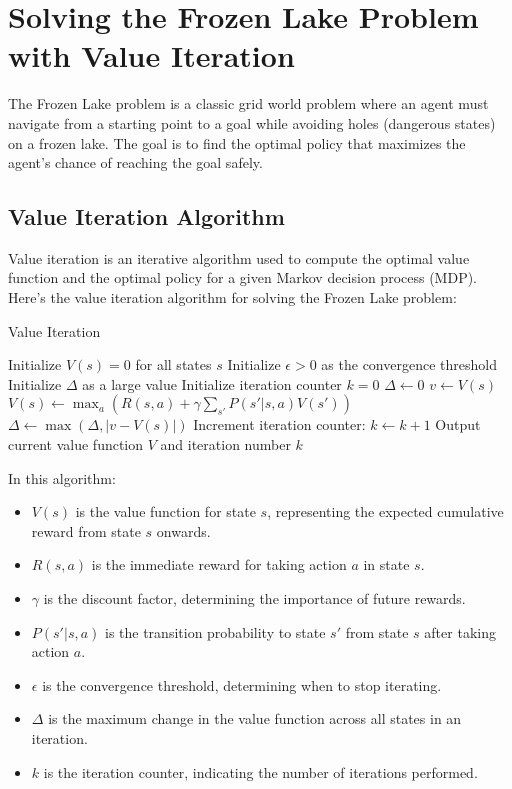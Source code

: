 \documentclass{article}
\begin{document}
\section*{Solving the Frozen Lake Problem with Value Iteration}

The Frozen Lake problem is a classic grid world problem where an agent must navigate from a starting point to a goal while avoiding holes (dangerous states) on a frozen lake. The goal is to find the optimal policy that maximizes the agent's chance of reaching the goal safely.

\subsection*{Value Iteration Algorithm}

Value iteration is an iterative algorithm used to compute the optimal value function and the optimal policy for a given Markov decision process (MDP). Here's the value iteration algorithm for solving the Frozen Lake problem:

\begin{algorithm}
\caption{Value Iteration}
\begin{algorithmic}[1]
\State Initialize $V(s) = 0$ for all states $s$
\State Initialize $\epsilon > 0$ as the convergence threshold
\State Initialize $\Delta$ as a large value
\State Initialize iteration counter $k = 0$
\While{$\Delta > \epsilon$}
    \State $\Delta \gets 0$
        \State $v \gets V(s)$
        \State $V(s) \gets \max_a \left( R(s, a) + \gamma \sum_{s'} P(s' | s, a) V(s') \right)$
        \State $\Delta \gets \max(\Delta, |v - V(s)|)$
    \EndFor
    \State Increment iteration counter: $k \gets k + 1$
    \State Output current value function $V$ and iteration number $k$
\EndWhile
\end{algorithmic}
\end{algorithm}

In this algorithm:
\begin{itemize}
    \item $V(s)$ is the value function for state $s$, representing the expected cumulative reward from state $s$ onwards.
    \item $R(s, a)$ is the immediate reward for taking action $a$ in state $s$.
    \item $\gamma$ is the discount factor, determining the importance of future rewards.
    \item $P(s' | s, a)$ is the transition probability to state $s'$ from state $s$ after taking action $a$.
    \item $\epsilon$ is the convergence threshold, determining when to stop iterating.
    \item $\Delta$ is the maximum change in the value function across all states in an iteration.
    \item $k$ is the iteration counter, indicating the number of iterations performed.
\end{itemize}
\end{document}
